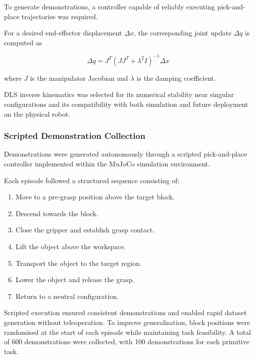 \documentclass[conference, 12pt]{IEEEtran}
\begin{document}
To generate demonstrations, a controller capable of reliably executing pick-and-place trajectories was required.

For a desired end-effector displacement $\Delta x$, the corresponding joint update $\Delta q$ is computed as

\begin{equation}
\Delta q = J^T (JJ^T + \lambda^2 I)^{-1}\Delta x
\end{equation}

where $J$ is the manipulator Jacobian and $\lambda$ is the damping coefficient.

DLS inverse kinematics was selected for its numerical stability near singular configurations and its compatibility with both simulation and future deployment on the physical robot.


\subsubsection{Scripted Demonstration Collection}

Demonstrations were generated autonomously through a scripted pick-and-place controller implemented within the MuJoCo simulation environment.

Each episode followed a structured sequence consisting of:

\begin{enumerate}
\item Move to a pre-grasp position above the target block.
\item Descend towards the block.
\item Close the gripper and establish grasp contact.
\item Lift the object above the workspace.
\item Transport the object to the target region.
\item Lower the object and release the grasp.
\item Return to a neutral configuration.
\end{enumerate}

Scripted execution ensured consistent demonstrations and enabled rapid dataset generation without teleoperation. To improve generalisation, block positions were randomised at the start of each episode while maintaining task feasibility. A total of 600 demonstrations were collected, with 100 demonstrations for each primitive task.
\end{document}
